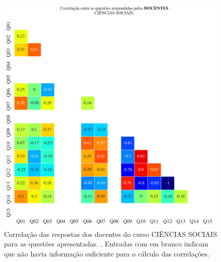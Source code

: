 \documentclass[a4paper,10pt]{article}
\begin{document}
\begin{figure}[h]
\centering
\includegraphics[width=0.999\linewidth]{matriz_corr__docentes_313087.png}
\caption{\label{fig:corr_docentes}Correlação das respostas dos docentes do curso CIÊNCIAS SOCIAIS para as questões apresentadas. . Entradas com em branco indicam que não havia informação suficiente para o cálculo das correlações.}
\end{figure}
\end{document}
